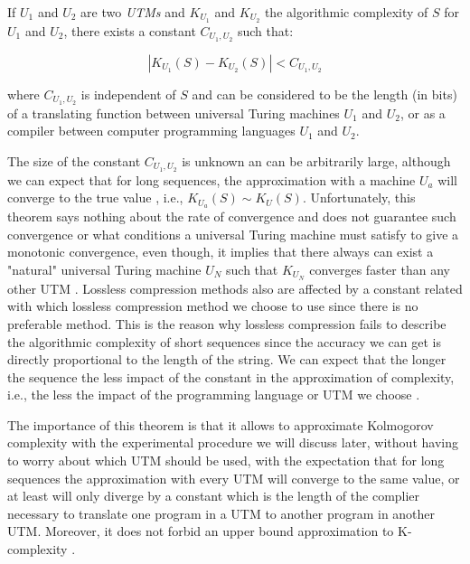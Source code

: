 \begin{theorem}
If $U_{1}$ and $U_{2}$ are two \textit{UTMs} and $K_{U_{1}}$ and $K_{U_{2}}$ the algorithmic complexity of $S$ for $U_{1}$ and $U_{2}$, there exists a constant $C_{U_{1},U_{2}}$ such that:

\begin{equation}
  |K_{U_{1}}(S)-K_{U_{2}}(S)|<C_{U_{1},U_{2}}
\end{equation}

where $C_{U_{1},U_{2}}$ is independent of $S$ and can be considered to be the length (in bits) of a translating function between universal Turing machines $U_{1}$ and $U_{2}$, or as a compiler between computer programming languages $U_{1}$ and $U_{2}$.
\end{theorem}

The size of the constant $C_{U_{1},U_{2}}$ is unknown an can be arbitrarily large, although we can expect that for long sequences, the approximation with a machine $U_{a}$ will converge to the true value \cite{decomposition}, i.e., $K_{U_{a}}(S) \sim K_{U}(S)$.
Unfortunately, this theorem says nothing about the rate of convergence and does not guarantee such convergence or what conditions a universal Turing machine must satisfy to give a monotonic convergence, even though, it implies that there always can exist a "natural" universal Turing machine $U_{N}$ such that $K_{U_{N}}$ converges faster than any other UTM \cite{decomposition}.
Lossless compression methods also are affected by a constant related with which lossless compression method we choose to use since there is no preferable method. This is the reason why lossless compression fails to describe the algorithmic complexity of short sequences since the accuracy we can get is directly proportional to the length of the string. We can expect that the longer the sequence the less impact of the constant in the approximation of complexity, i.e., the less the impact of the programming language or UTM we choose \cite{kolmo_calculating}.

The importance of this theorem is that it allows to approximate Kolmogorov complexity with the experimental procedure we will discuss later, without having to worry about which UTM should be used, with the expectation that for long sequences the approximation with every UTM will converge to the same value, or at least will only diverge by a constant which is the length of the complier necessary to translate one program in a UTM to another program in another UTM. Moreover, it does not forbid an upper bound approximation to K-complexity \cite{decomposition}.


